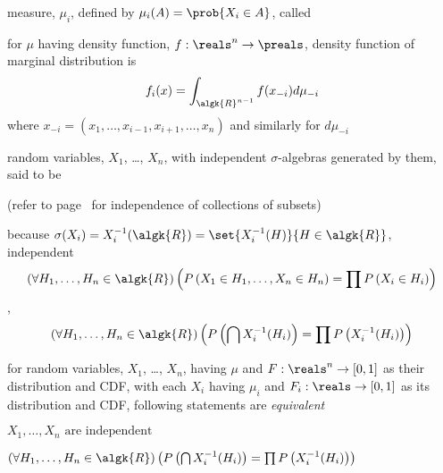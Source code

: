 \documentclass[17pt,landscape]{foils}
\newcommand{\algR}{\algk{R}}
\begin{document}
{\vitem
	measure, $\mu_i$, defined by $\mu_i(A) = \prob{X_i\in A}$,
	called %

\vitem
	for $\mu$ having density function, $f:\reals^n\to\preals$,
	density function of marginal distribution is
	\[
		f_i(x) = \int_{\algR^{n-1}}
			f(x_{-i}) d \mu_{-i}
	\]
	where $x_{-i} = (x_1,\ldots,x_{i-1}, x_{i+1}, \ldots, x_n)$
	and similarly for $d\mu_{-i}$
\eit


%

\bit
\item
	random variables, $X_1$, \ldots, $X_n$,
	with independent $\sigma$-algebras generated by them,
	said to be %

\item []
	(refer to page~\pageref{probability spaces!independence!of collection of classes of events} for
		independence of collections of subsets)
	\bit
	\item
		because $\sigma(X_i) = X_i^{-1}(\algR)=\set{X_i^{-1}(H)}{H\in\algR}$,
		independent \iaoi\
		\[
			\left(
				\forall H_1, \ldots, H_n\in \algR
			\right)
			\left(
				P\left(X_1\in H_1,\ldots, X_n\in H_n\right)
				= \prod P\left(X_i\in H_i\right)
			\right)
		\]
		\ie,
		\[
			\left(
				\forall H_1, \ldots, H_n\in \algR
			\right)
			\left(
				P\left(\bigcap X_i^{-1}(H_i)\right)
				= \prod P\left(X_i^{-1}(H_i)\right)
			\right)
		\]

	\eit
\eit



\bit
\item for random variables, $X_1$, \ldots, $X_n$,
	having $\mu$ and $F:\reals^n\to[0,1]$ as their distribution and CDF,
	with each $X_i$ having $\mu_i$ and $F_i:\reals\to[0,1]$ as its distribution and CDF,
	following statements are \emph{equivalent}%

	\bit
	\vitem
		$X_1,\ldots,X_n \mbox{ are independent}$

	\vitem
		$\left( \forall H_1, \ldots, H_n\in \algR \right) \left( P\left(\bigcap X_i^{-1}(H_i)\right) = \prod P\left(X_i^{-1}(H_i)\right) \right)$

}
\end{document}
